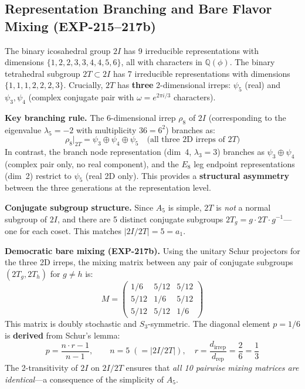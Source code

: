 \documentclass[12pt,a4paper]{article}
\begin{document}
\subsection{Representation Branching and Bare Flavor Mixing (EXP-215--217b)}
\label{sec:branching_mixing}

The binary icosahedral group $2I$ has 9 irreducible representations with dimensions $\{1, 2, 2, 3, 3, 4, 4, 5, 6\}$, all with characters in $\mathbb{Q}(\phi)$. The binary tetrahedral subgroup $2T \subset 2I$ has 7 irreducible representations with dimensions $\{1, 1, 1, 2, 2, 2, 3\}$. Crucially, $2T$ has \textbf{three} 2-dimensional irreps: $\psi_5$ (real) and $\psi_3, \psi_4$ (complex conjugate pair with $\omega = e^{2\pi i/3}$ characters).

\textbf{Key branching rule.} The 6-dimensional irrep $\rho_8$ of $2I$ (corresponding to the eigenvalue $\lambda_5 = -2$ with multiplicity $36 = 6^2$) branches as:
\begin{equation}
\boxed{\rho_8|_{2T} = \psi_3 \oplus \psi_4 \oplus \psi_5 \quad \text{(all three 2D irreps of } 2T\text{)}}
\end{equation}
In contrast, the branch node representation (dim~4, $\lambda_3 = 3$) branches as $\psi_3 \oplus \psi_4$ (complex pair only, no real component), and the $E_8$ leg endpoint representations (dim~2) restrict to $\psi_5$ (real 2D only). This provides a \textbf{structural asymmetry} between the three generations at the representation level.

\textbf{Conjugate subgroup structure.} Since $A_5$ is simple, $2T$ is \emph{not} a normal subgroup of $2I$, and there are 5 distinct conjugate subgroups $2T_g = g \cdot 2T \cdot g^{-1}$---one for each coset. This matches $|2I/2T| = 5 = a_1$.

\textbf{Democratic bare mixing (EXP-217b).} Using the unitary Schur projectors for the three 2D irreps, the mixing matrix between any pair of conjugate subgroups $(2T_g, 2T_h)$ for $g \neq h$ is:
\begin{equation}
\boxed{M = \begin{pmatrix} 1/6 & 5/12 & 5/12 \\ 5/12 & 1/6 & 5/12 \\ 5/12 & 5/12 & 1/6 \end{pmatrix}}
\label{eq:bare_mixing}
\end{equation}
This matrix is doubly stochastic and $S_3$-symmetric. The diagonal element $p = 1/6$ is \textbf{derived} from Schur's lemma:
\begin{equation}
p = \frac{n \cdot r - 1}{n - 1}, \qquad n = 5 \;(= |2I/2T|), \quad r = \frac{d_{\text{irrep}}}{d_{\text{rep}}} = \frac{2}{6} = \frac{1}{3}
\end{equation}
The 2-transitivity of $2I$ on $2I/2T$ ensures that \emph{all 10 pairwise mixing matrices are identical}---a consequence of the simplicity of $A_5$.
\end{document}
